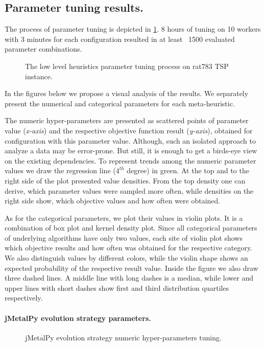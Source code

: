 \subsection{Parameter tuning results.} 
The process of parameter tuning is depicted in \cref{eval:pict:mh tuning}. 8 hours of tuning on 10 workers with 3 minutes for each configuration resulted in at least ~1500 evaluated parameter combinations. 

\begin{figure}[h!]
	\centering
	
	\caption{The low level heuristics parameter tuning process on rat783 TSP instance.}
	\label{eval:pict:mh tuning}
\end{figure}

In the figures below we propose a visual analysis of the results. We separately present the numerical and categorical parameters for each meta-heuristic.

The numeric hyper-parameters are presented as scattered points of parameter value (\emph{x-axis}) and the respective objective function result (\emph{y-axis}), obtained for configuration with this parameter value. Although, such an isolated approach to analyze a data may be error-prone. But still, it is enough to get a birds-eye view on the existing dependencies. To represent trends among the numeric parameter values we draw the regression line ($4^{th}$ degree) in green. At the top and to the right side of the plot presented value densities. From the top density one can derive, which parameter values were sampled more often, while densities on the right side show, which objective values and how often were obtained. 

As for the categorical parameters, we plot their values in violin plots. It is a combination of box plot and kernel density plot. Since all categorical parameters of underlying algorithms have only two values, each site of violin plot shows which objective results and how often was obtained for the respective category. We also distinguish values by different colors, while the violin shape shows an expected probability of the respective result value. Inside the figure we also draw three dashed lines. A middle line with long dashes is a median, while lower and upper lines with short dashes show first and third distribution quartiles respectively.


\paragraph{jMetalPy evolution strategy parameters.}
\begin{figure}[h!]
	\centering
	\vspace{-20pt}
	
	\caption{jMetalPy evolution strategy numeric hyper-parameters tuning.}
	\label{eval:pict:jmetalpy es numeric}
	\vspace{-15pt}
\end{figure}

